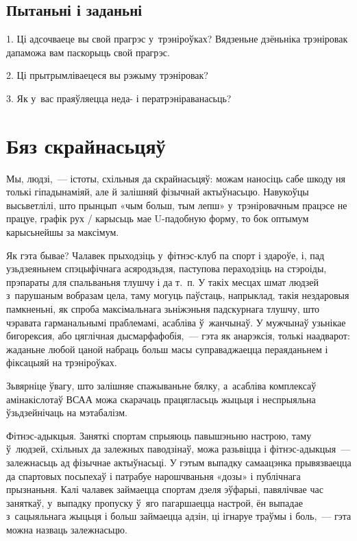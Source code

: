\subsection*{Пытаньні і заданьні}

1. Ці адсочваеце вы свой прагрэс у~трэніроўках? Вядзеньне дзёньніка трэніровак дапаможа вам паскорыць свой прагрэс.

2. Ці прытрымліваецеся вы рэжыму трэніровак?

3. Як у~вас праяўляецца неда- і ператрэніраванасьць?


\section{Бяз скрайнасьцяў}

Мы, людзі,~--- істоты, схільныя да скрайнасьцяў: можам наносіць сабе шкоду ня толькі гіпадынаміяй, але й залішняй фізычнай актыўнасьцю. Навукоўцы высьветлілі, што прынцып «чым больш, тым лепш» у~трэніровачным працэсе не працуе, графік рух / карысьць мае U-падобную форму, то бок оптымум карысьнейшы за максімум.

Як гэта бывае? Чалавек прыходзіць у~фітнэс-клуб па спорт і здароўе, і, пад узьдзеяньнем спэцыфічнага асяродзьдзя, паступова пераходзіць на стэроіды, прэпараты для спальваньня тлушчу і да т.~п. У такіх месцах шмат людзей з~парушаным вобразам цела, таму могуць паўстаць, напрыклад, такія нездаровыя памкненьні, як спроба максімальнага зьніжэньня падскурнага тлушчу, што чэравата гарманальнымі праблемамі, асабліва ў~жанчынаў. У мужчынаў узьнікае бигорексия, або цяглічная дысмарфафобія,~--- гэта як анарэксія, толькі наадварот: жаданьне любой цаной набраць больш масы суправаджаецца пераяданьнем і фіксацыяй на трэніроўках.

Зьвярніце ўвагу, што залішняе спажываньне бялку, а~асабліва комплексаў амінакіслотаў ВСАА можа скарачаць працягласьць жыцьця і неспрыяльна ўзьдзейнічаць на мэтабалізм.

Фітнэс-адыкцыя. Заняткі спортам спрыяюць павышэньню настрою, таму ў~людзей, схільных да залежных паводзінаў, можа разьвіцца і фітнэс-адыкцыя~--- залежнасьць ад фізычнае актыўнасьці. У гэтым выпадку самаацэнка прывязваецца да спартовых посьпехаў і патрабуе нарошчваньня «дозы» і публічнага прызнаньня. Калі чалавек займаецца спортам дзеля эўфарыі, павялічвае час заняткаў, у~выпадку пропуску ў~яго пагаршаецца настрой, ён выпадае з~сацыяльнага жыцьця і больш займаецца адзін, ці ігнаруе траўмы і боль,~--- гэта можна назваць залежнасьцю.

